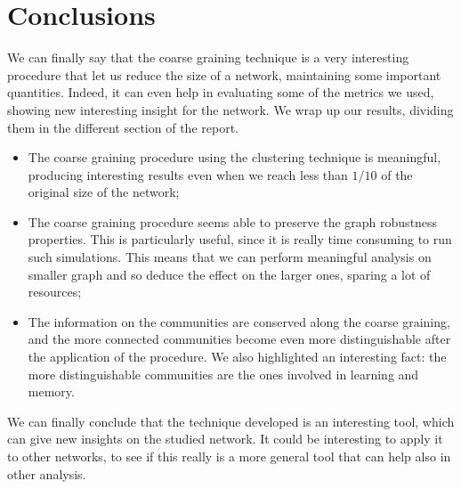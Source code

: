 \section{Conclusions \label{sec:concl}}
We can finally say that the coarse graining technique is a very
interesting procedure that let us reduce the size of a network, 
maintaining some important quantities. Indeed, it can even help in 
evaluating some of the metrics we used, showing new interesting
insight for the network. We wrap up our results, dividing them 
in the different section of the report.
\begin{itemize}
    \item The coarse graining procedure using the clustering technique
        is meaningful, producing interesting results even when we reach
        less than $1/10$ of the original size of the network;
    \item The coarse graining procedure seems able to preserve the 
        graph robustness properties. This is particularly useful, since
        it is really time consuming to run such simulations. This means
        that we can perform meaningful analysis on smaller graph and so
        deduce the effect on the larger ones, sparing a lot of resources;
    \item The information on the communities are conserved along the coarse
        graining, and the more connected communities become even more distinguishable
        after the application of the procedure. We also highlighted an interesting
        fact: the more distinguishable communities are the ones involved in 
        learning and memory.
\end{itemize} 
We can finally conclude that the technique developed is an interesting
tool, which can give new insights on the studied network.
It could be interesting to apply it to other networks, to see if this really
is a more general tool that can help also in other analysis.
